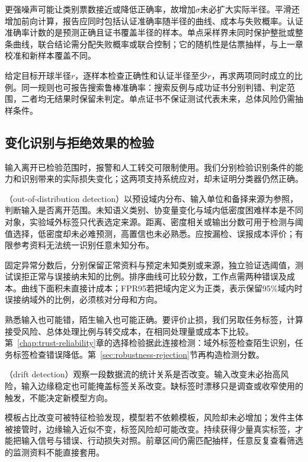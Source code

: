 更强噪声可能让类别票数接近或降低正确率，故增加$\sigma$未必扩大实际半径。平滑还增加前向计算，报告应同时包括认证准确率随半径的曲线、成本与失败概率。认证准确率计数的是预测正确且证书覆盖半径的样本。单点采样界未同时保护整批或整条曲线，联合结论需分配失败概率或联合控制；它的随机性是估票抽样，与上一章校准和新样本覆盖不同。

给定目标开球半径$r$，逐样本检查正确性和认证半径至少$r$，再求两项同时成立的比例。同一规则也可报告搜索鲁棒准确率：搜索反例与成功证书分别判错、判定范围，二者均无结果时保留未判定。单点证书不保证测试代表未来，总体风险仍需抽样条件。

\subsection{变化识别与拒绝效果的检验}
\label{sec:robustness-monitor-test}

输入离开已检验范围时，报警和人工转交可限制使用。我们分别检验识别条件的能力和识别带来的实际损失变化；这两项支持系统应对，却未证明分类器仍然正确。

（out-of-distribution detection）以预设域内分布、输入单位和备择来源为参照，判断输入是否离开范围。未知语义类别、协变量变化与域内低密度困难样本是不同对象，实验域外标签只代表选定来源。距离、密度相关或输出分数可用于检测与阈值选择，低密度却未必难预测，高置信也未必熟悉。应按漏检、误报成本评价；有限参考资料无法统一识别任意未知分布。

固定异常分数后，分别保留正常资料与预定未知类别或来源，独立验证选阈值，测试误拒正常与误接纳未知的比例。排序曲线可比较分数，工作点需两种错误及成本。曲线下面积未直接计成本；FPR95若把域内定义为正类，表示保留95\%域内时误接纳域外的比例，必须核对分母和方向。

熟悉输入也可能错，陌生输入也可能正确。要评价止损，我们另取任务标签，计算接受风险、总体处理比例与转交成本，在相同处理量或成本下比较。第~\ref{chap:trust-reliability}章的选择检验据此连接检测：域外标签检查陌生识别，任务标签检查错误降低。第~\ref{sec:robustness-rejection}节再构造检测分数。

（drift detection）观察一段数据流的统计关系是否改变。输入改变未必抬高风险，输入边缘稳定也可能掩盖标签关系改变。缺标签时漂移只是调查或收窄使用的触发，不能决定新模型方向。

模板占比改变可被特征检验发现，模型若不依赖模板，风险却未必增加；发件主体被接管时，边缘输入近似不变，标签风险却可能改变。持续获得少量真实标签，才能把输入信号与错误、行动损失对照。前章区间仍需匹配抽样，任意反复查看筛选的监测资料不能直接套用。

